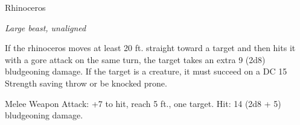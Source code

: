 \begin{monsterbox}{Rhinoceros}
\begin{hangingpar}
\textit{Large beast, unaligned}
\end{hangingpar}
\dndline%
\basics[%
armorclass = 11,
hitpoints = 6d10 + 12,
speed = {40 ft.}
]
\dndline%
\stats[%
STR = \stat{21},
DEX = \stat{8},
CON = \stat{15},
INT = \stat{2},
WIS = \stat{12},
CHA = \stat{6}
]
\dndline%
\details[%
skills={},
damageimmunities={},
savingthrows={},
conditionimmunities={},
damageresistances={},
damagevulnerabilities={},
senses={passive Perception 11},
challenge=2
]
\dndline%
\begin{monsteraction}[Charge]
If the rhinoceros moves at least 20 ft. straight toward a target and then hits it with a gore attack on the same turn, the target takes an extra 9 (2d8) bludgeoning damage. If the target is a creature, it must succeed on a DC 15 Strength saving throw or be knocked prone.
\end{monsteraction}
\begin{monsteraction}[Gore]
Melee Weapon Attack: +7 to hit, reach 5 ft., one target. Hit: 14 (2d8 + 5) bludgeoning damage.
\end{monsteraction}
\end{monsterbox}